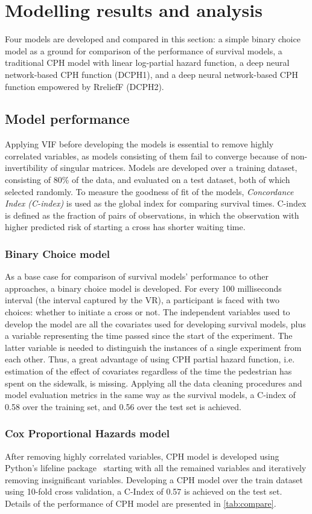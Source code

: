 \section{Modelling results and analysis}
\label{S:results}
Four models are developed and compared in this section: a simple binary choice model as a ground for comparison of the performance of survival models, a traditional CPH model with linear log-partial hazard function, a deep neural network-based CPH function (DCPH1), and a deep neural network-based CPH function empowered by RreliefF (DCPH2).

\subsection{Model performance}
Applying VIF before developing the models is essential to remove highly correlated variables, as models consisting of them fail to converge because of non-invertibility of singular matrices. Models are developed over a training dataset, consisting of 80\% of the data, and evaluated on a test dataset, both of which selected randomly. To measure the goodness of fit of the models, \textit{Concordance Index (C-index)} is used as the global index for comparing survival times. C-index is defined as the fraction of pairs of observations, in which the observation with higher predicted risk of starting a cross has shorter waiting time.
\subsubsection{Binary Choice model}
As a base case for comparison of survival models' performance to other approaches, a binary choice model is developed. For every 100 milliseconds interval (the interval captured by the VR), a participant is faced with two choices: whether to initiate a cross or not. The independent variables used to develop the model are all the covariates used for developing survival models, plus a variable representing the time passed since the start of the experiment. The latter variable is needed to distinguish the instances of a single experiment from each other. Thus, a great advantage of using CPH partial hazard function, i.e. estimation of the effect of covariates regardless of the time the pedestrian has spent on the sidewalk, is missing. Applying all the data cleaning procedures and model evaluation metrics in the same way as the survival models, a C-index of 0.58 over the training set, and 0.56 over the test set is achieved.
\subsubsection{Cox Proportional Hazards model}
 After removing highly correlated variables, CPH model is developed using Python's lifeline package~\citep{cameron_davidson_pilon_2020_4002777} starting with all the remained variables and iteratively removing insignificant variables. Developing a CPH model over the train dataset using 10-fold cross validation, a C-Index of 0.57 is achieved on the test set. Details of the performance of CPH model are presented in \cref{tab:compare}.
